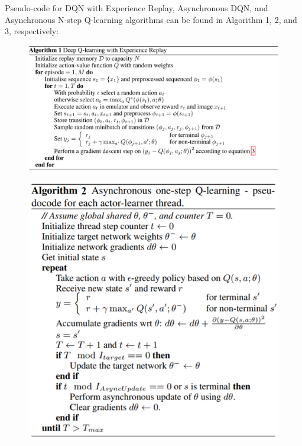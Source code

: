 \documentclass[11pt]{article}
\begin{document}
Pseudo-code for DQN with Experience Replay\cite{mnih}, Asynchronous DQN\cite{mnihAsync}, and Asynchronous N-step Q-learning algorithms \cite{mnihAsync} can be found in Algorithm 1, 2, and 3, respectively: \\
\begin{figure}[H]
    \includegraphics[scale=0.4]{dqn}
\end{figure}
\begin{figure}[H]
    \includegraphics[scale=1.1]{asynchronous}
    \label{fig:my_label}
\end{figure}
\end{document}
